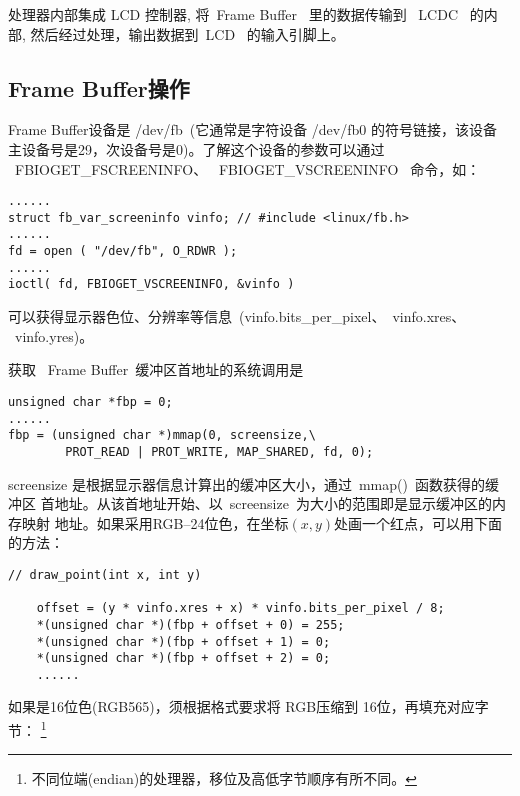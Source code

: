 	处理器内部集成 LCD 控制器, 将~Frame Buffer~ 里的数据传输到 ~LCDC~ 的内部,
然后经过处理，输出数据到~LCD~ 的输入引脚上。

\subsection{Frame Buffer操作}
	Frame Buffer设备是 /dev/fb~(它通常是字符设备 /dev/fb0 的符号链接，该设备
主设备号是29，次设备号是0)。了解这个设备的参数可以通过 ~FBIOGET\_FSCREENINFO、
~FBIOGET\_VSCREENINFO~ 命令，如：

\begin{boxedminipage}{.9\textwidth}
\begin{verbatim}
......
struct fb_var_screeninfo vinfo; // #include <linux/fb.h>
......
fd = open ( "/dev/fb", O_RDWR );
......
ioctl( fd, FBIOGET_VSCREENINFO, &vinfo )
\end{verbatim}
\end{boxedminipage}

可以获得显示器色位、分辨率等信息~(vinfo.bits\_per\_pixel、~vinfo.xres、
~vinfo.yres)。

获取 ~Frame Buffer~缓冲区首地址的系统调用是

\begin{boxedminipage}{.9\textwidth}
\begin{verbatim}
unsigned char *fbp = 0;
......
fbp = (unsigned char *)mmap(0, screensize,\
        PROT_READ | PROT_WRITE, MAP_SHARED, fd, 0);
\end{verbatim}
\end{boxedminipage}

screensize 是根据显示器信息计算出的缓冲区大小，通过~mmap()~函数获得的缓冲区
首地址。从该首地址开始、以~screensize~为大小的范围即是显示缓冲区的内存映射
地址。如果采用RGB--24位色，在坐标$(x, y)$处画一个红点，可以用下面的方法：

\begin{boxedminipage}{.9\textwidth}
\begin{verbatim}
// draw_point(int x, int y)

    offset = (y * vinfo.xres + x) * vinfo.bits_per_pixel / 8;
    *(unsigned char *)(fbp + offset + 0) = 255;
    *(unsigned char *)(fbp + offset + 1) = 0;
    *(unsigned char *)(fbp + offset + 2) = 0;
    ......
\end{verbatim}
\end{boxedminipage}

	如果是16位色(RGB565)，须根据格式要求将 RGB压缩到 16位，再填充对应字节：
\footnote{不同位端(endian)的处理器，移位及高低字节顺序有所不同。}

